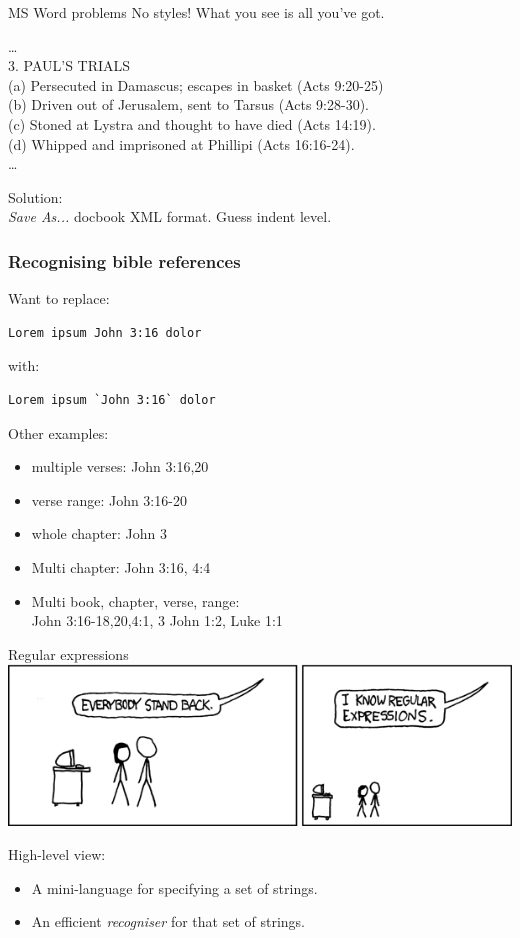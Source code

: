\documentclass{beamer}
\begin{document}
\begin{frame}{MS Word problems}
No styles! What you see is all you've got.

    \begin{framed} %
        \ldots\\
3. PAUL'S TRIALS\\
\quad (a) Persecuted in Damascus; escapes in basket (Acts 9:20-25)\\
\quad (b) Driven out of Jerusalem, sent to Tarsus (Acts 9:28-30).\\
\quad (c) Stoned at Lystra and thought to have died (Acts 14:19).\\
\quad (d) Whipped and imprisoned at Phillipi (Acts 16:16-24).\\
\ldots
\end{framed}
Solution:\\
\emph{Save As...} docbook XML format. Guess indent level.  
\end{frame}
    
\begin{frame}[fragile]
    \frametitle{Recognising bible references}
     Want to replace:\\
     \begin{verbatim}Lorem ipsum John 3:16 dolor
\end{verbatim}
     with:\\
 \begin{verbatim}Lorem ipsum `John 3:16` dolor
\end{verbatim}
Other examples:
\begin{itemize}
\item multiple verses: John 3:16,20
\item verse range: John 3:16-20
\item whole chapter: John 3
\item Multi chapter: John 3:16, 4:4
\item Multi book, chapter, verse, range:\\
    John 3:16-18,20,4:1, 3 John 1:2, Luke 1:1
\end{itemize}
\end{frame}

\begin{frame}{Regular expressions}
    \includegraphics[keepaspectratio=true, width=0.9\paperwidth]{regular_expressions.png}

High-level view:
\begin{itemize}
\item A mini-language for specifying a set of strings.
\item An efficient \emph{recogniser} for that set of strings.
\end{itemize}

\end{frame}
\end{document}

